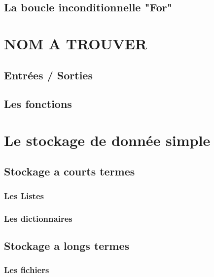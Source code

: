\section*{La boucle inconditionnelle "For"} \label{sec:for}




\chapter{NOM A TROUVER}

\section*{Entrées / Sorties} \label{sec:En/sor}

\section*{Les fonctions} \label{sec:fonction}




\chapter{Le stockage de donnée simple}

\section*{Stockage a courts termes} \label{sec:VEX}

\subsection*{Les Listes} \label{sec:liste}

\subsection*{Les dictionnaires} \label{sec:dictionnaire}

\section*{Stockage a longs termes} \label{sec:VEX}

\subsection*{Les fichiers} \label{sec:fichier}









